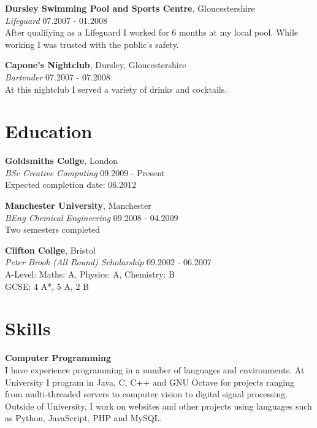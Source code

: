 \documentclass[margin,line,a4paper]{resume}
\begin{document}
\begin{resume}
\textbf{Dursley Swimming Pool and Sports Centre}, Gloucestershire  \vspace{1mm}\\
\textsl{Lifeguard} \hfill 07.2007 - 01.2008 \vspace{2mm} \\
After qualifying as a Lifeguard I worked for 6 months at my local pool. While working I was trusted with the public's safety.

\textbf{Capone's Nightclub}, Dursley, Gloucestershire  \vspace{1mm}\\
\textsl{Bartender} \hfill 07.2007 - 07.2008 \vspace{2mm} \\
At this nightclub I served a variety of drinks and cocktails.

\section{\mysidestyle Education}

\textbf{Goldsmiths Collge}, London \vspace{1mm}\\
\textsl{BSc Creative Computing} \hfill 09.2009 - Present \vspace{2mm} \\
Expected completion date: 06.2012

\textbf{Manchester University}, Manchester \vspace{1mm}\\
\textsl{BEng Chemical Engineering} \hfill 09.2008 - 04.2009 \vspace{2mm} \\
Two semesters completed 

\textbf{Clifton Collge}, Bristol \vspace{1mm}\\
\textsl{Peter Brook (All Round) Scholarship} \hfill 09.2002 - 06.2007 \vspace{2mm} \\
A-Level: Maths: A, Physics: A, Chemistry: B \\
GCSE: 4 A*, 5 A, 2 B \\


\section{\mysidestyle Skills}

\textbf{Computer Programming} \vspace{1mm} \\
I have experience programming in a number of languages and environments. At University I program in Java, C, C++ and GNU Octave for projects ranging from multi-threaded servers to computer vision to digital signal processing. Outside of University, I work on websites and other projects using languages such as Python, JavaScript, PHP and MySQL.


\end{resume}
\end{document}

